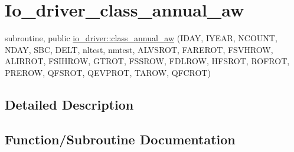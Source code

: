 \hypertarget{group__io__driver__class__annual__aw}{}\section{Io\+\_\+driver\+\_\+class\+\_\+annual\+\_\+aw}
\label{group__io__driver__class__annual__aw}
\begin{DoxyCompactItemize}
\item 
subroutine, public \hyperlink{group__io__driver__class__annual__aw_ga958601139bd592e2ac9c074c3cd41eb1}{io\+\_\+driver\+::class\+\_\+annual\+\_\+aw} (I\+D\+A\+Y, I\+Y\+E\+A\+R, N\+C\+O\+U\+N\+T, N\+D\+A\+Y, S\+B\+C, D\+E\+L\+T, nltest, nmtest, A\+L\+V\+S\+R\+O\+T, F\+A\+R\+E\+R\+O\+T, F\+S\+V\+H\+R\+O\+W, A\+L\+I\+R\+R\+O\+T, F\+S\+I\+H\+R\+O\+W, G\+T\+R\+O\+T, F\+S\+S\+R\+O\+W, F\+D\+L\+R\+O\+W, H\+F\+S\+R\+O\+T, R\+O\+F\+R\+O\+T, P\+R\+E\+R\+O\+W, Q\+F\+S\+R\+O\+T, Q\+E\+V\+P\+R\+O\+T, T\+A\+R\+O\+W, Q\+F\+C\+R\+O\+T)
\end{DoxyCompactItemize}


\subsection{Detailed Description}


\subsection{Function/\+Subroutine Documentation}
\hypertarget{group__io__driver__class__annual__aw_ga958601139bd592e2ac9c074c3cd41eb1}{}
